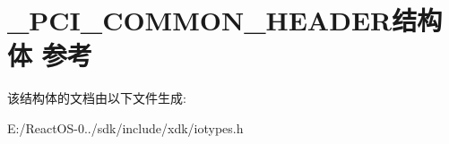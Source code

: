 \hypertarget{struct___p_c_i___c_o_m_m_o_n___h_e_a_d_e_r}{}\section{\+\_\+\+P\+C\+I\+\_\+\+C\+O\+M\+M\+O\+N\+\_\+\+H\+E\+A\+D\+E\+R结构体 参考}
\label{struct___p_c_i___c_o_m_m_o_n___h_e_a_d_e_r}


该结构体的文档由以下文件生成\+:\begin{DoxyCompactItemize}
\item 
E\+:/\+React\+O\+S-\/0../sdk/include/xdk/iotypes.\+h\end{DoxyCompactItemize}
